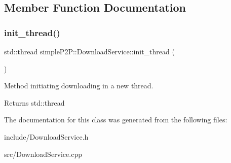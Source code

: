 \subsection{Member Function Documentation}
\mbox{\label{classsimpleP2P_1_1DownloadService_a420979e6932be2f09bcc2b34e7ac8b7a}} 
\subsubsection{\texorpdfstring{init\+\_\+thread()}{init\_thread()}}
{\footnotesize\ttfamily std\+::thread simple\+P2\+P\+::\+Download\+Service\+::init\+\_\+thread (\begin{DoxyParamCaption}{ }\end{DoxyParamCaption})}



Method initiating downloading in a new thread. 

\begin{DoxyReturn}{Returns}
std\+::thread 
\end{DoxyReturn}


The documentation for this class was generated from the following files\+:\begin{DoxyCompactItemize}
\item 
include/Download\+Service.\+h\item 
src/Download\+Service.\+cpp\end{DoxyCompactItemize}
